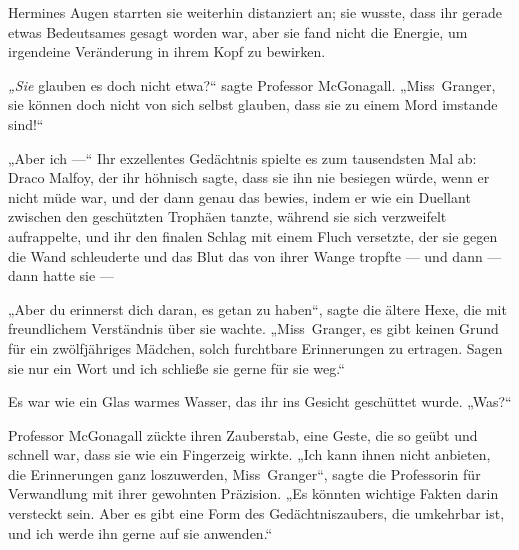Hermines Augen starrten sie weiterhin distanziert an; sie wusste, dass ihr gerade etwas Bedeutsames gesagt worden war, aber sie fand nicht die Energie, um irgendeine Veränderung in ihrem Kopf zu bewirken.

\emph{„Sie} glauben es doch nicht etwa?“ sagte Professor McGonagall.
„Miss~Granger, sie können doch nicht von sich selbst glauben, dass sie zu einem Mord imstande sind!“

„Aber ich —“ Ihr exzellentes Gedächtnis spielte es zum tausendsten Mal ab: Draco Malfoy, der ihr höhnisch sagte, dass sie ihn nie besiegen würde, wenn er nicht müde war, und der dann genau das bewies, indem er wie ein Duellant zwischen den geschützten Trophäen tanzte, während sie sich verzweifelt aufrappelte, und ihr den finalen Schlag mit einem Fluch versetzte, der sie gegen die Wand schleuderte und das Blut das von ihrer Wange tropfte — und dann — dann hatte sie —

„Aber du erinnerst dich daran, es getan zu haben“, sagte die ältere Hexe, die mit freundlichem Verständnis über sie wachte.
„Miss~Granger, es gibt keinen Grund für ein zwölfjähriges Mädchen, solch furchtbare Erinnerungen zu ertragen. Sagen sie nur ein Wort und ich schließe sie gerne für sie weg.“

Es war wie ein Glas warmes Wasser, das ihr ins Gesicht geschüttet wurde.
„Was?“

Professor McGonagall zückte ihren Zauberstab, eine Geste, die so geübt und schnell war, dass sie wie ein Fingerzeig wirkte.
„Ich kann ihnen nicht anbieten, die Erinnerungen ganz loszuwerden, Miss~Granger“, sagte die Professorin für Verwandlung mit ihrer gewohnten Präzision.
„Es könnten wichtige Fakten darin versteckt sein. Aber es gibt eine Form des Gedächtniszaubers, die umkehrbar ist, und ich werde ihn gerne auf sie anwenden.“


